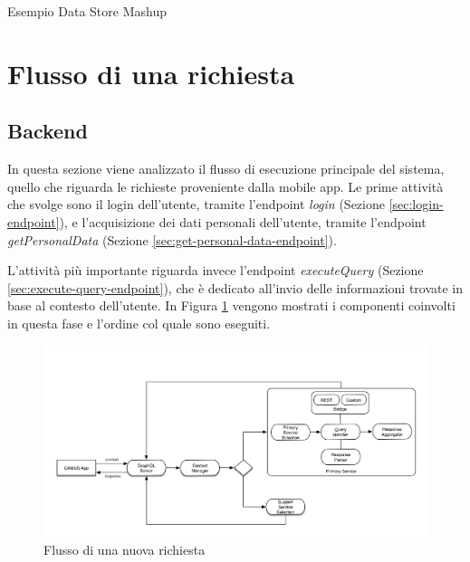 \begin{listing}[H]
	\inputminted{json}{4-progettazione-alto-livello/Codice/store-two-topics.json}
	\caption{Esempio Data Store Mashup}
	\label{lst:store-two-topics}
\end{listing}

\section{Flusso di una richiesta}

\subsection{Backend\label{sec:flusso-richiesta-server}}

In questa sezione viene analizzato il flusso di esecuzione principale del sistema, quello che riguarda le richieste proveniente dalla mobile app. Le prime attività che svolge sono il login dell'utente, tramite l'endpoint \emph{login} (Sezione \ref{sec:login-endpoint}), e l'acquisizione dei dati personali dell'utente, tramite l'endpoint \emph{getPersonalData} (Sezione \ref{sec:get-personal-data-endpoint}).

L'attività più importante riguarda invece l'endpoint \emph{executeQuery} (Sezione \ref{sec:execute-query-endpoint}), che è dedicato all'invio delle informazioni trovate in base al contesto dell'utente. In Figura \ref{fig:flusso-nuova-richiesta} vengono mostrati i componenti coinvolti in questa fase e l'ordine col quale sono eseguiti.

\begin{figure}[ht]
	\centering
	\includegraphics[width=\textwidth]{4-progettazione-alto-livello/Immagini/flusso-richiesta-backend.png}
	\caption{Flusso di una nuova richiesta\label{fig:flusso-nuova-richiesta}}
\end{figure}

